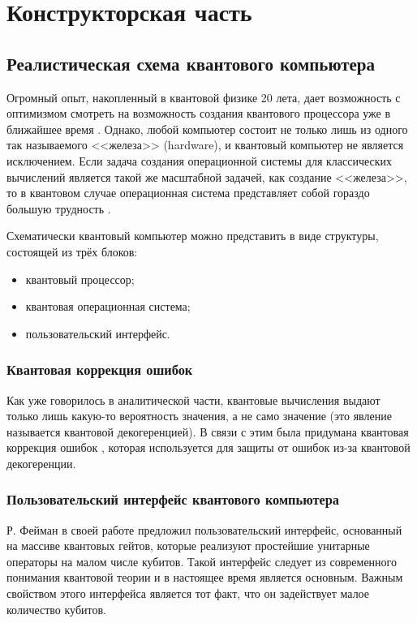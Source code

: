\chapter{Конструкторская часть}

\section{Реалистическая схема квантового компьютера}

Огромный опыт, накопленный в квантовой физике 20 лета, дает возможность с оптимизмом смотреть на возможность создания квантового процессора уже в ближайшее время \cite{quantum-computer}. Однако, любой компьютер состоит не только лишь из одного так называемого <<железа>> (hardware), и квантовый компьютер не является исключением. Если задача создания операционной системы для классических вычислений является такой же масштабной задачей, как создание <<железа>>, то в квантовом случае операционная система представляет собой гораздо большую трудность \cite{quantum-computer}.

Схематически квантовый компьютер можно представить в виде структуры, состоящей из трёх блоков:

\begin{itemize}
	\item квантовый процессор;
	\item квантовая операционная система;
	\item пользовательский интерфейс.
\end{itemize}

\subsection{Квантовая коррекция ошибок}
Как уже говорилось в аналитической части, квантовые вычисления выдают только лишь какую-то вероятность значения, а не само значение (это явление называется квантовой декогеренцией). В связи с этим была придумана квантовая коррекция ошибок \cite{quantum-codes}, которая используется для защиты от ошибок из-за квантовой декогеренции. 

\subsection{Пользовательский интерфейс квантового компьютера}

Р. Фейман в своей работе \cite{feynman} предложил пользовательский интерфейс, основанный на массиве квантовых гейтов, которые реализуют простейшие унитарные операторы на малом числе кубитов. Такой интерфейс следует из современного понимания квантовой теории \cite{quantum-computer} и в настоящее время является основным. Важным свойством этого интерфейса является тот факт, что он задействует малое количество кубитов.

